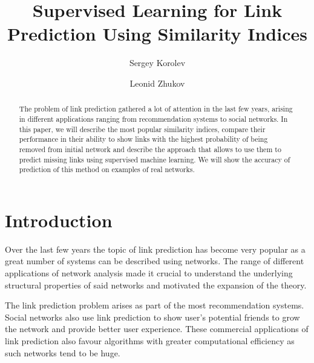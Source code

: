 \documentclass{llncs}
\begin{document}
%
\title{Supervised Learning for Link Prediction Using Similarity Indices}
%
%
\author{Sergey Korolev \and Leonid Zhukov}
%
%
%

\maketitle              %

\begin{abstract}
The problem of link prediction gathered a lot of attention in the last few years,
arising in different applications ranging from recommendation systems to social networks.
In this paper, we will describe the most popular similarity indices, compare their
performance in their ability to show links with the highest probability
of being removed from initial network and describe the approach
that allows to use them to predict missing links using supervised machine learning. 
We will show the accuracy of prediction of this method on examples of real networks.
\end{abstract}
%
\section{Introduction}
%
Over the last few years the topic of link prediction has become very popular as a great number of systems can be described using networks. The range of different applications of network analysis made it crucial to understand the underlying structural properties of said networks and motivated the expansion of the theory.

The link prediction problem arises as part of the most recommendation systems. Social networks also use link prediction to show user's potential friends to grow the network and provide better user experience. These commercial applications of link prediction also favour algorithms with greater computational efficiency as such networks tend to be huge.
\end{document}
